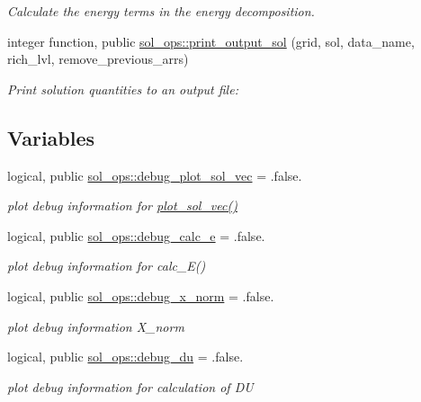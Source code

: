 \begin{DoxyCompactItemize}
\begin{DoxyCompactList}\small\item\em Calculate the energy terms in the energy decomposition. \end{DoxyCompactList}\item 
integer function, public \hyperlink{namespacesol__ops_a06eb95d55da45ff2a1f830a380e0cf80}{sol\+\_\+ops\+::print\+\_\+output\+\_\+sol} (grid, sol, data\+\_\+name, rich\+\_\+lvl, remove\+\_\+previous\+\_\+arrs)
\begin{DoxyCompactList}\small\item\em Print solution quantities to an output file\+: \end{DoxyCompactList}\end{DoxyCompactItemize}
\subsection*{Variables}
\begin{DoxyCompactItemize}
\item 
logical, public \hyperlink{namespacesol__ops_ae0df0d66ef4ea0155cfbeb23973c28ac}{sol\+\_\+ops\+::debug\+\_\+plot\+\_\+sol\+\_\+vec} = .false.
\begin{DoxyCompactList}\small\item\em plot debug information for \hyperlink{namespacesol__ops_a13b3cf2fb6437a3c93256368fa91c267}{plot\+\_\+sol\+\_\+vec()} \end{DoxyCompactList}\item 
logical, public \hyperlink{namespacesol__ops_a4dc364bc6b70b805abdc3ed0ab2e5226}{sol\+\_\+ops\+::debug\+\_\+calc\+\_\+e} = .false.
\begin{DoxyCompactList}\small\item\em plot debug information for calc\+\_\+\+E() \end{DoxyCompactList}\item 
logical, public \hyperlink{namespacesol__ops_a718171b8636e5e4ad98fd4e35ca5b71f}{sol\+\_\+ops\+::debug\+\_\+x\+\_\+norm} = .false.
\begin{DoxyCompactList}\small\item\em plot debug information {\ttfamily X\+\_\+norm} \end{DoxyCompactList}\item 
logical, public \hyperlink{namespacesol__ops_acb6465b87495933920896a52b4298a4c}{sol\+\_\+ops\+::debug\+\_\+du} = .false.
\begin{DoxyCompactList}\small\item\em plot debug information for calculation of {\ttfamily DU} \end{DoxyCompactList}\end{DoxyCompactItemize}
